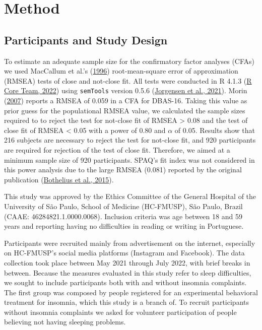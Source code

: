 \documentclass[
  ,doc,11pt, twoside,floatsintext]{apa6}
\begin{document}
\newpage

\hypertarget{method}{%
\section{Method}\label{method}}

\hypertarget{participants-and-study-design}{%
\subsection{Participants and Study Design}\label{participants-and-study-design}}

To estimate an adequate sample size for the confirmatory factor analyses (CFAs) we used MacCallum et al.'s (\protect\hyperlink{ref-maccallum1996}{1996}) root-mean-square error of approximation (RMSEA) tests of close and not-close fit. All tests were conducted in R 4.1.3 (\protect\hyperlink{ref-R-base}{R Core Team, 2022}) using \texttt{semTools} version 0.5.6 (\protect\hyperlink{ref-semtools}{Jorgensen et al., 2021}). Morin (\protect\hyperlink{ref-morin2007a}{2007}) reports a RMSEA of 0.059 in a CFA for DBAS-16. Taking this value as prior guess for the populational RMSEA value, we calculated the sample sizes required to to reject the test for not-close fit of RMSEA \textgreater{} 0.08 and the test of close fit of RMSEA \textless{} 0.05 with a power of 0.80 and \(\alpha\) of 0.05. Results show that 216 subjects are necessary to reject the test for not-close fit, and 920 participants are required for rejection of the test of close fit. Therefore, we aimed at a minimum sample size of 920 participants. SPAQ's fit index was not considered in this power analysis due to the large RMSEA (0.081) reported by the original publication (\protect\hyperlink{ref-bothelius2015}{Bothelius et al., 2015}).

This study was approved by the Ethics Committee of the General Hospital of the University of São Paulo, School of Medicine (HC-FMUSP), São Paulo, Brazil (CAAE: 46284821.1.0000.0068). Inclusion criteria was age between 18 and 59 years and reporting having no difficulties in reading or writing in Portuguese.

Participants were recruited mainly from advertisement on the internet, especially on HC-FMUSP's social media platforms (Instagram and Facebook). The data collection took place between May 2021 through July 2022, with brief breaks in between. Because the measures evaluated in this study refer to sleep difficulties, we sought to include participants both with and without insomnia complaints. The first group was composed by people registered for an experimental behavioral treatment for insomnia, which this study is a branch of. To recruit participants without insomnia complaints we asked for volunteer participation of people believing not having sleeping problems.
\end{document}
